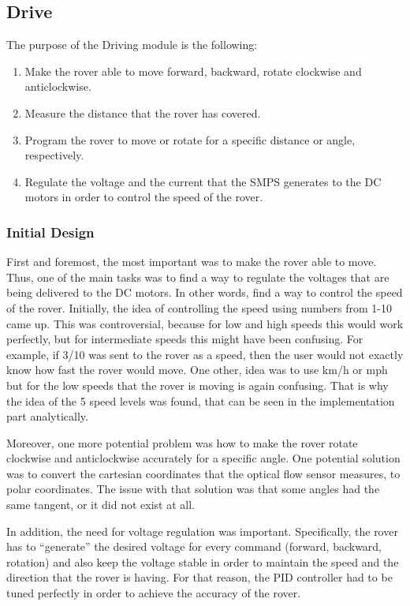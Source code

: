 \documentclass[a4paper]{article}
\begin{document}
\subsection{Drive}
The purpose of the Driving module is the following:
\begin{enumerate}
  \item Make the rover able to move forward, backward, rotate clockwise and anticlockwise.
  \item Measure the distance that the rover has covered. 
  \item Program the rover to move or rotate for a specific distance or angle, respectively.
  \item Regulate the voltage and the current that the SMPS generates to the DC motors in order to control the speed of the rover.
\end{enumerate}
\subsubsection{Initial Design}
First and foremost, the most important was to make the rover able to move. Thus, one of the main tasks was to find a way to regulate the voltages that are being delivered to the DC motors. In other words, find a way to control the speed of the rover. Initially, the idea of controlling the speed using numbers from 1-10 came up. This was controversial, because for low and high speeds this would work perfectly, but for intermediate speeds this might have been confusing. For example, if 3/10 was sent to the rover as a speed, then the user would not exactly know how fast the rover would move. One other, idea was to use km/h or mph but for the low speeds that the rover is moving is again confusing. That is why the idea of the 5 speed levels was found, that can be seen in the implementation part analytically. 

Moreover, one more potential problem was how to make the rover rotate clockwise and anticlockwise accurately for a specific angle. One potential solution was to convert the cartesian coordinates that the optical flow sensor measures, to polar coordinates. The issue with that solution was that some angles had the same tangent, or it did not exist at all. 

In addition, the need for voltage regulation was important. Specifically, the rover has to “generate” the desired voltage for every command (forward, backward, rotation) and also keep the voltage stable in order to maintain the speed and the direction that the rover is having. For that reason, the PID controller had to be tuned perfectly in order to achieve the accuracy of the rover.
\end{document}
